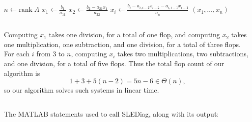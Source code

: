 \documentclass[11pt]{article}
\begin{document}
\subsection{} %
\begin{algorithmic}[1]
	\State $n \gets \text{rank}\;A$
	\State $x_1 \gets \frac{b_1}{a_{11}}$
	\State $x_2 \gets \frac{b_2-a_{21}x_1}{a_{22}}$
	\State $x_i \gets \frac{b_i-a_{i,i-2}x_{i-2}-a_{i,i-1}x_{i-1}}{a_{ii}}$
	\EndFor
	\State \Return $(x_1,\ldots,x_n)$
	\EndFunction
\end{algorithmic}


\subsection{} %
Computing $x_1$ takes one division, for a total of one flop, and computing
$x_2$ takes one multiplication, one subtraction, and one division, for a total
of three flops. For each $i$ from 3 to $n$, computing $x_i$ takes two
multiplications, two subtractions, and one division, for a total of five
flops. Thus the total flop count of our algorithm is
\[1+3+5(n-2)=5n-6\in\Theta(n),\]
so our algorithm solves such systems in linear time.


\subsection{} %

The MATLAB statements used to call SLEDiag, along with its output:



\section{} %
\end{document}
